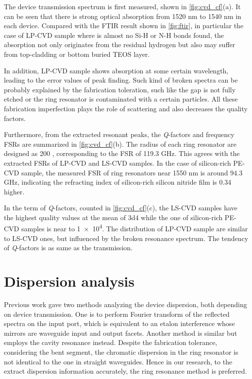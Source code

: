 The device transmission spectrum is first measured, shown in \autoref{fig:cvd_cf}(a). It can be seen that there is strong optical absorption from 1520 nm to 1540 nm in each device. Compared with the FTIR result shown in \autoref{fig:ftir}, in particular the case of LP-CVD sample where is almost no Si-H or N-H bonds found, the absorption not only originates from the residual hydrogen but also may suffer from top-cladding or bottom buried TEOS layer. 

In addition, LP-CVD sample shows absorption at some certain wavelength, leading to the error values of peak finding. Such kind of broken spectra can be probably explained by the fabrication toleration, such like the gap is not fully etched or the ring resonator is contaminated with a certain particles. All these fabrication imperfection plays the role of scattering and also decreases the quality factors.

Furthermore, from the extracted resonant peaks, the \textit{Q}-factors and frequency FSRs are summarized in \autoref{fig:cvd_cf}(b). The radius of each ring resonator are designed as 200 \um, corresponding to the FSR of 119.3 GHz. This agrees with the extracted FSRs of LP-CVD and LS-CVD samples. In the case of silicon-rich PE-CVD sample, the measured FSR of ring resonators near 1550 nm is around 94.3 GHz, indicating the refracting index of silicon-rich silicon nitride film is 0.34 higher.

In the term of \textit{Q}-factors, counted in \autoref{fig:cvd_cf}(c), the LS-CVD samples have the highest quality values at the mean of \num{3d4} while the one of silicon-rich PE-CVD samples is near to \num{1e4}. The distribution of LP-CVD sample are similar to LS-CVD ones, but influenced by the broken resonance spectrum. The tendency of \textit{Q}-factors is as same as the transmission.

\begin{figure}
	\centering
	
	\label{fig:cvd_cf}
\end{figure}




\section{Dispersion analysis}

Previous work \cite{Sunada2018} gave two methods analyzing the device dispersion, both depending on device transmission. One is to perform Fourier transform of the reflected spectra on the input port, which is equivalent to an etalon interference whose mirrors are waveguide input and output facets. Another method is similar but employs the cavity resonance instead. Despite the fabrication tolerance, considering the bent segment, the chromatic dispersion in the ring resonator is not identical to the one in straight waveguides. Hence in our research, to the extract dispersion information accurately, the ring resonance method is preferred. 

